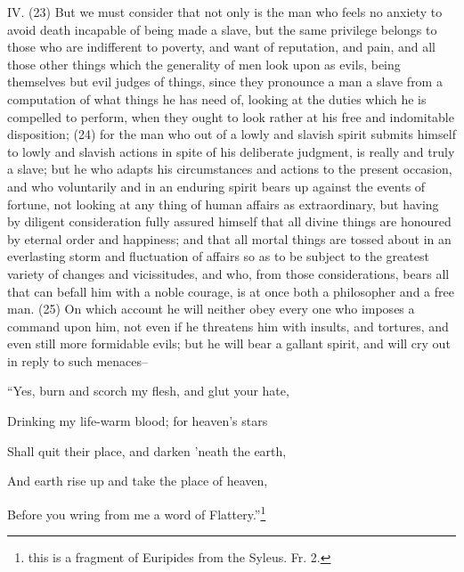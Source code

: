 IV. (23) But we must consider that not only is the man who feels no anxiety to avoid death
incapable of being made a slave, but the same privilege belongs to those who are indifferent to
poverty, and want of reputation, and pain, and all those other things which the generality of men
look upon as evils, being themselves but evil judges of things, since they pronounce a man a slave
from a computation of what things he has need of, looking at the duties which he is compelled to
perform, when they ought to look rather at his free and indomitable disposition; (24) for the man
who out of a lowly and slavish spirit submits himself to lowly and slavish actions in spite of his
deliberate judgment, is really and truly a slave; but he who adapts his circumstances and actions to
the present occasion, and who voluntarily and in an enduring spirit bears up against the events of
fortune, not looking at any thing of human affairs as extraordinary, but having by diligent
consideration fully assured himself that all divine things are honoured by eternal order and
happiness; and that all mortal things are tossed about in an everlasting storm and fluctuation of
affairs so as to be subject to the greatest variety of changes and vicissitudes, and who, from those
considerations, bears all that can befall him with a noble courage, is at once both a philosopher
and a free man. (25) On which account he will neither obey every one who imposes a command
upon him, not even if he threatens him with insults, and tortures, and even still more formidable
evils; but he will bear a gallant spirit, and will cry out in reply to such menaces--

``Yes, burn and scorch my flesh, and glut your hate,

Drinking my life-warm blood; for heaven's stars

Shall quit their place, and darken 'neath the earth,

And earth rise up and take the place of heaven,

Before you wring from me a word of Flattery.''\footnote{this is a fragment of Euripides from the Syleus. Fr. 2.}

